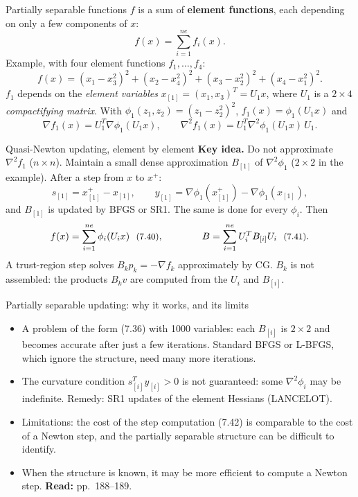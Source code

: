 \documentclass[aspectratio=169,12pt]{beamer}
\newcommand{\gradf}{\nabla f}
\newcommand{\hessf}{\nabla^{2} f}
\newcommand{\eqn}[1]{\text{\small(#1)}}
\newcommand{\readbook}[1]{{\color{red}\textbf{Read:} #1}}
\begin{document}
\begin{frame}{Partially separable functions}
  $f$ is a sum of \textbf{element functions}, each depending on only a few components of $x$:
  \[ f(x)=\sum_{i=1}^{ne}f_{i}(x) . \tag{7.35} \]
  Example, with four element functions $f_{1},\dots,f_{4}$:
  \[
    f(x)=(x_{1}-x_{3}^{2})^{2}+(x_{2}-x_{4}^{2})^{2}+(x_{3}-x_{2}^{2})^{2}+(x_{4}-x_{1}^{2})^{2} .
    \tag{7.36}
  \]
  $f_{1}$ depends on the \emph{element variables} $x_{[1]}=(x_{1},x_{3})^{T}=U_{1}x$, where $U_{1}$ is a
  $2\times 4$ \emph{compactifying matrix}. With $\phi_{1}(z_{1},z_{2})=(z_{1}-z_{2}^{2})^{2}$, $f_{1}(x)=\phi_{1}(U_{1}x)$ and
  \[
    \gradf_{1}(x)=U_{1}^{T}\nabla\phi_{1}(U_{1}x),\qquad
    \hessf_{1}(x)=U_{1}^{T}\nabla^{2}\phi_{1}(U_{1}x)\,U_{1} .
    \tag{7.37}
  \]
\end{frame}

\begin{frame}{Quasi-Newton updating, element by element}
  \textbf{Key idea.} Do not approximate $\hessf_{1}$ ($n\times n$). Maintain a small dense
  approximation $B_{[1]}$ of $\nabla^{2}\phi_{1}$ ($2\times 2$ in the example). After a step from $x$ to $x^{+}$:
  \[
    s_{[1]}=x_{[1]}^{+}-x_{[1]},\qquad y_{[1]}=\nabla\phi_{1}(x_{[1]}^{+})-\nabla\phi_{1}(x_{[1]}),
    \tag{7.38}
  \]
  and $B_{[1]}$ is updated by BFGS or SR1. The same is done for every $\phi_{i}$. Then
  \[
    f(x)=\sum_{i=1}^{ne}\phi_{i}(U_{i}x)\ \ \eqn{7.40},
    \qquad\qquad
    B=\sum_{i=1}^{ne}U_{i}^{T}B_{[i]}U_{i}\ \ \eqn{7.41} .
  \]
  A trust-region step solves $B_{k}p_{k}=-\gradf_{k}$ \eqn{7.42} approximately by CG.
  $B_{k}$ is not assembled: the products $B_{k}v$ are computed from the $U_{i}$ and $B_{[i]}$.
\end{frame}

\begin{frame}{Partially separable updating: why it works, and its limits}
  \begin{itemize}\setlength\itemsep{0.55em}
    \item A problem of the form (7.36) with 1000 variables: each $B_{[i]}$ is $2\times 2$ and becomes
      accurate after just a few iterations. \alert{Standard BFGS or L-BFGS}, which ignore the
      structure, need many more iterations.
    \item The curvature condition $s_{[i]}^{T}y_{[i]}>0$ is not guaranteed: some $\nabla^{2}\phi_{i}$ may be
      indefinite. Remedy: SR1 updates of the element Hessians (LANCELOT).
    \item Limitations: the cost of the step computation (7.42) is comparable to the cost of
      a Newton step, and the partially separable structure can be difficult to identify.
    \item When the structure is known, it may be more efficient to compute a Newton step.
      \readbook{pp.~188--189.}
  \end{itemize}
\end{frame}
\end{document}
